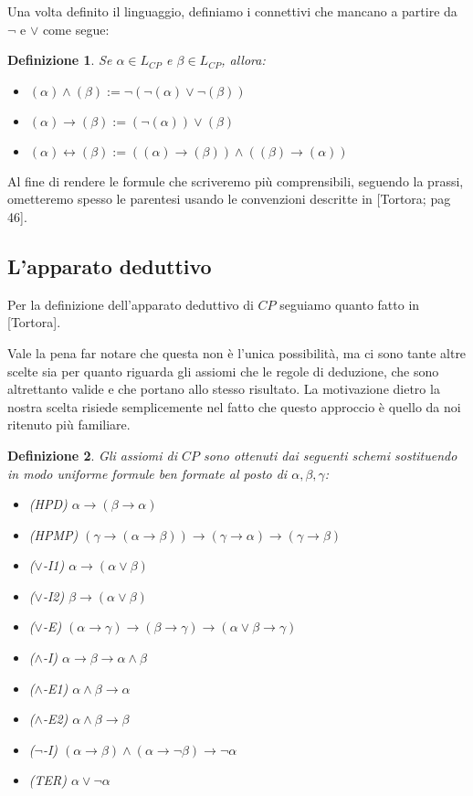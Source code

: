 \documentclass[a4paper, 12pt]{article}
\newtheorem{definition}{Definizione}
\begin{document}
Una volta definito il linguaggio, definiamo i connettivi che mancano a partire da $\neg$ e $\lor$
come segue:
\begin{definition}
Se $\alpha \in L_{CP}$ e $\beta \in L_{CP}$, allora:
\begin{itemize}
\item $(\alpha) \land (\beta) := \neg(\neg(\alpha) \lor \neg(\beta))$
\item $(\alpha) \rightarrow (\beta) := (\neg(\alpha)) \lor (\beta)$
\item $(\alpha) \leftrightarrow (\beta) := ((\alpha) \rightarrow (\beta)) \land ((\beta) \rightarrow (\alpha))$
\end{itemize}
\end{definition}

Al fine di rendere le formule che scriveremo più comprensibili, seguendo la prassi,
ometteremo spesso le parentesi usando le convenzioni descritte in [Tortora; pag 46].

\subsection{L'apparato deduttivo}
Per la definizione dell'apparato deduttivo di $CP$ seguiamo quanto fatto in [Tortora].

Vale la pena far notare che questa non è l'unica possibilità, ma ci sono tante altre scelte sia
per quanto riguarda gli assiomi che le regole di deduzione, che sono altrettanto valide
e che portano allo stesso risultato. La motivazione dietro la nostra scelta
risiede semplicemente nel fatto che questo approccio è quello da noi ritenuto più familiare.

\begin{definition}
Gli assiomi di $CP$ sono ottenuti dai seguenti schemi
sostituendo in modo uniforme formule ben formate al posto di $\alpha, \beta, \gamma$:
\begin{itemize}
\item (HPD) $\alpha \rightarrow (\beta \rightarrow \alpha)$
\item (HPMP) $(\gamma \rightarrow (\alpha \rightarrow \beta)) \rightarrow (\gamma \rightarrow \alpha) \rightarrow (\gamma \rightarrow \beta)$
\item ($\lor$-I1) $\alpha \rightarrow (\alpha \lor \beta)$
\item ($\lor$-I2) $\beta \rightarrow (\alpha \lor \beta)$
\item ($\lor$-E) $(\alpha \rightarrow \gamma) \rightarrow (\beta \rightarrow \gamma) \rightarrow (\alpha \lor \beta \rightarrow \gamma)$
\item ($\land$-I) $\alpha \rightarrow \beta \rightarrow \alpha \land \beta$
\item ($\land$-E1) $\alpha \land \beta \rightarrow \alpha$
\item ($\land$-E2) $\alpha \land \beta \rightarrow \beta$
\item ($\neg$-I) $(\alpha \rightarrow \beta) \land (\alpha \rightarrow \neg \beta) \rightarrow \neg \alpha$
\item (TER) $\alpha \lor \neg \alpha$
\end{itemize}
\end{definition}
\end{document}
